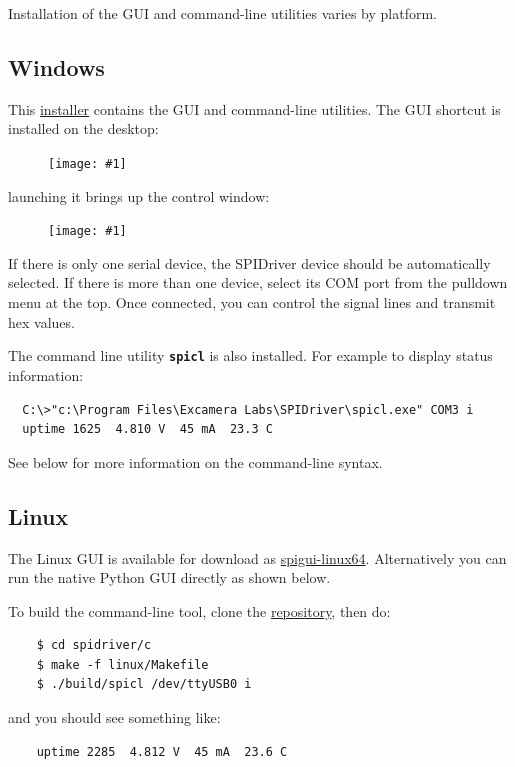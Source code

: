 \documentclass{article}
\newcommand{\png}[1]{
\begin{figure}[H]
\begin{center}
\texttt{[image: \#1]}
\end{center}
\end{figure}
}
\newcommand{\mach}[1]{\texttt{\textbf{#1}}}
\begin{document}
Installation of the GUI and command-line utilities varies by platform.

\subsection{Windows}

This
\href{https://spidriver.com/windows}{installer}
contains the GUI and command-line utilities.
The GUI shortcut is installed on the desktop:

\png{img/spidriver/icon}

launching it brings up the control window:

\png{img/spidriver/gui}

If there is only one serial device, 
the SPIDriver device should be automatically selected.
If there is more than one device, select its COM port from the pulldown menu at the top.
Once connected, you can control the signal lines and transmit hex values.

\index{spicl@\mach{spicl}}
The command line utility \mach{spicl} is also installed. For example to display status information:

\begin{lstlisting}
  C:\>"c:\Program Files\Excamera Labs\SPIDriver\spicl.exe" COM3 i
  uptime 1625  4.810 V  45 mA  23.3 C
\end{lstlisting}

See below for more information on the command-line syntax.

\subsection{Linux}

The Linux GUI is available for download as
\href{https://spidriver.com/linux}{spigui-linux64}.
Alternatively you can run the native Python GUI directly as shown below.

\index{spicl@\mach{spicl}}
To build the command-line tool, clone the
\href{https://github.com/jamesbowman/spidriver}{repository}, then do:
\begin{lstlisting}
    $ cd spidriver/c
    $ make -f linux/Makefile
    $ ./build/spicl /dev/ttyUSB0 i
\end{lstlisting}
and you should see something like:

\begin{lstlisting}
    uptime 2285  4.812 V  45 mA  23.6 C
\end{lstlisting}
\end{document}
